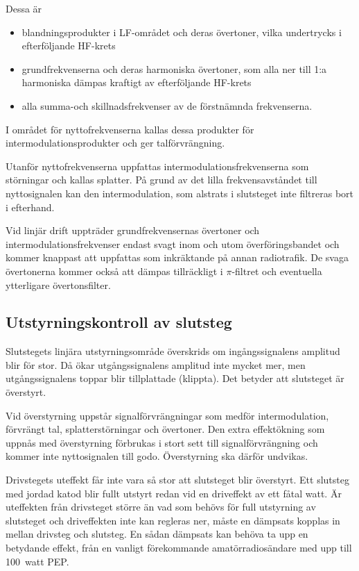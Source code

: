 Dessa är
\begin{itemize}
\item blandningsprodukter i LF-området och deras övertoner, vilka
  undertrycks i efterföljande HF-krets

\item grundfrekvenserna och deras harmoniska övertoner, som alla ner
  till 1:a harmoniska dämpas kraftigt av efterföljande HF-krets

\item alla summa-och skillnadsfrekvenser av de förstnämnda frekvenserna.
\end{itemize}

I området för nyttofrekvenserna kallas dessa produkter för
intermodulationsprodukter och ger talförvrängning.

Utanför nyttofrekvenserna uppfattas intermodulationsfrekvenserna som
störningar och kallas splatter.
På grund av det lilla frekvensavståndet till nyttosignalen kan den
intermodulation, som alstrats i slutsteget inte filtreras bort i efterhand.

Vid linjär drift uppträder grundfrekvensernas övertoner och
intermodulationsfrekvenser endast svagt inom och utom
överföringsbandet och kommer knappast att uppfattas som inkräktande på
annan radiotrafik.
De svaga övertonerna kommer också att dämpas tillräckligt i \(\pi \)-filtret
och eventuella ytterligare övertonsfilter.


\subsection{Utstyrningskontroll av slutsteg}

Slutstegets linjära utstyrningsområde överskrids om ingångssignalens
amplitud blir för stor.
Då ökar utgångssignalens amplitud inte mycket mer, men utgångssignalens toppar
blir tillplattade (klippta).
Det betyder att slutsteget är överstyrt.

Vid överstyrning uppstår signalförvrängningar som medför intermodulation,
förvrängt tal, splatterstörningar och övertoner.
Den extra effektökning som uppnås med överstyrning förbrukas i stort sett
till signalförvrängning och kommer inte nyttosignalen till godo.
Överstyrning ska därför undvikas.

Drivstegets uteffekt får inte vara så stor att slutsteget blir överstyrt.
Ett slutsteg med jordad katod blir fullt utstyrt redan vid en driveffekt av ett
fåtal watt.
Är uteffekten från drivsteget större än vad som behövs för full utstyrning av
slutsteget och driveffekten inte kan regleras ner, måste en dämpsats
kopplas in mellan drivsteg och slutsteg.
En sådan dämpsats kan behöva ta upp en betydande effekt, från en vanligt
förekommande amatörradiosändare med upp till 100~watt PEP.

